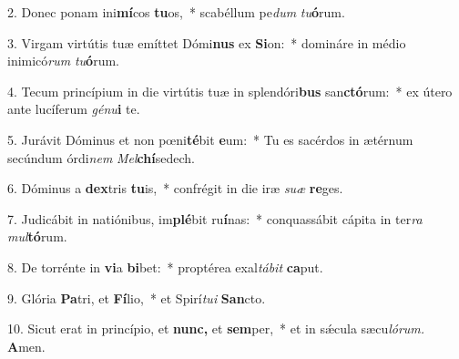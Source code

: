 \item 2. Donec ponam ini\textbf{mí}cos \textbf{tu}os,~* scabéllum pe\textit{dum} \textit{tu}\textbf{ó}rum.
\item 3. Virgam virtútis tuæ emíttet Dómi\textbf{nus} ex \textbf{Si}on:~* domináre in médio inimicó\textit{rum} \textit{tu}\textbf{ó}rum.
\item 4. Tecum princípium in die virtútis tuæ in splendóri\textbf{bus} san\textbf{ctó}rum:~* ex útero ante lucíferum \textit{génu}\textbf{i} te.
\item 5. Jurávit Dóminus et non pœni\textbf{té}bit \textbf{e}um:~* Tu es sacérdos in ætérnum secúndum órdi\textit{nem} \textit{Mel}\textbf{chí}sedech.
\item 6. Dóminus a \textbf{dex}tris \textbf{tu}is,~* confrégit in die iræ \textit{suæ} \textbf{re}ges.
\item 7. Judicábit in natiónibus, im\textbf{plé}bit ru\textbf{í}nas:~* conquassábit cápita in ter\textit{ra} \textit{mul}\textbf{tó}rum.
\item 8. De torrénte in \textbf{vi}a \textbf{bi}bet:~* proptérea exal\textit{tábit} \textbf{ca}put.
\item 9. Glória \textbf{Pa}tri, et \textbf{Fí}lio,~* et Spirí\textit{tui} \textbf{San}cto.
\item 10. Sicut erat in princípio, et \textbf{nunc,} et \textbf{sem}per,~* et in sǽcula sæcu\textit{lórum.} \textbf{A}men.